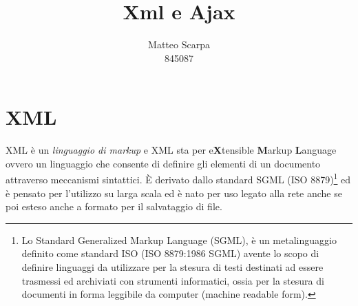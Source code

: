 \documentclass{report}
\title{Xml e Ajax}
\author{Matteo Scarpa\\ 845087}
\date{}
\begin{document}
\maketitle

\chapter{XML}
XML è un \textit{linguaggio di markup} e XML sta per e\textbf{X}tensible \textbf{M}arkup \textbf{L}anguage ovvero un linguaggio che consente di definire gli elementi di un documento attraverso meccanismi sintattici.
È derivato dallo standard SGML (ISO 8879)\footnote{Lo Standard Generalized Markup Language (SGML), è un metalinguaggio definito come standard ISO (ISO 8879:1986 SGML) avente lo scopo di definire linguaggi da utilizzare per la stesura di testi destinati ad essere trasmessi ed archiviati con strumenti informatici, ossia per la stesura di documenti in forma leggibile da computer (machine readable form).} 
ed è pensato per l'utilizzo su larga scala ed è nato per uso legato alla rete anche se poi esteso anche a formato per il salvataggio di file.
\end{document}

